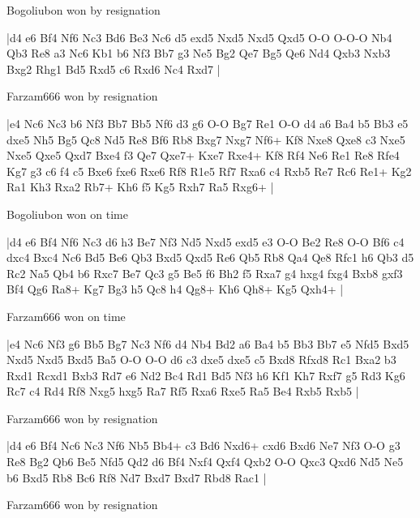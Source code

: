 Bogoliubon won by resignation

\makegametitle
|d4 e6 Bf4 Nf6 Nc3 Bd6 Be3 Nc6 d5 exd5 Nxd5 Nxd5 Qxd5 O-O O-O-O Nb4 Qb3 Re8 a3 Nc6 Kb1 b6 Nf3 Bb7 g3 Ne5 Bg2 Qe7 Bg5 Qe6 Nd4 Qxb3 Nxb3 Bxg2 Rhg1 Bd5 Rxd5 c6 Rxd6 Nc4 Rxd7  |

\showboard

Farzam666 won by resignation

\makegametitle
|e4 Nc6 Nc3 b6 Nf3 Bb7 Bb5 Nf6 d3 g6 O-O Bg7 Re1 O-O d4 a6 Ba4 b5 Bb3 e5 dxe5 Nh5 Bg5 Qc8 Nd5 Re8 Bf6 Rb8 Bxg7 Nxg7 Nf6+ Kf8 Nxe8 Qxe8 c3 Nxe5 Nxe5 Qxe5 Qxd7 Bxe4 f3 Qe7 Qxe7+ Kxe7 Rxe4+ Kf8 Rf4 Ne6 Re1 Re8 Rfe4 Kg7 g3 c6 f4 c5 Bxe6 fxe6 Rxe6 Rf8 R1e5 Rf7 Rxa6 c4 Rxb5 Re7 Rc6 Re1+ Kg2 Ra1 Kh3 Rxa2 Rb7+ Kh6 f5 Kg5 Rxh7 Ra5 Rxg6+  |

\showboard

Bogoliubon won on time

\makegametitle
|d4 e6 Bf4 Nf6 Nc3 d6 h3 Be7 Nf3 Nd5 Nxd5 exd5 e3 O-O Be2 Re8 O-O Bf6 c4 dxc4 Bxc4 Nc6 Bd5 Be6 Qb3 Bxd5 Qxd5 Re6 Qb5 Rb8 Qa4 Qe8 Rfc1 h6 Qb3 d5 Rc2 Na5 Qb4 b6 Rxc7 Be7 Qc3 g5 Be5 f6 Bh2 f5 Rxa7 g4 hxg4 fxg4 Bxb8 gxf3 Bf4 Qg6 Ra8+ Kg7 Bg3 h5 Qc8 h4 Qg8+ Kh6 Qh8+ Kg5 Qxh4+  |

\showboard

Farzam666 won on time

\makegametitle
|e4 Nc6 Nf3 g6 Bb5 Bg7 Nc3 Nf6 d4 Nb4 Bd2 a6 Ba4 b5 Bb3 Bb7 e5 Nfd5 Bxd5 Nxd5 Nxd5 Bxd5 Ba5 O-O O-O d6 c3 dxe5 dxe5 c5 Bxd8 Rfxd8 Rc1 Bxa2 b3 Rxd1 Rcxd1 Bxb3 Rd7 e6 Nd2 Bc4 Rd1 Bd5 Nf3 h6 Kf1 Kh7 Rxf7 g5 Rd3 Kg6 Rc7 c4 Rd4 Rf8 Nxg5 hxg5 Ra7 Rf5 Rxa6 Rxe5 Ra5 Be4 Rxb5 Rxb5  |

\showboard

Farzam666 won by resignation

\makegametitle
|d4 e6 Bf4 Nc6 Nc3 Nf6 Nb5 Bb4+ c3 Bd6 Nxd6+ cxd6 Bxd6 Ne7 Nf3 O-O g3 Re8 Bg2 Qb6 Be5 Nfd5 Qd2 d6 Bf4 Nxf4 Qxf4 Qxb2 O-O Qxc3 Qxd6 Nd5 Ne5 b6 Bxd5 Rb8 Bc6 Rf8 Nd7 Bxd7 Bxd7 Rbd8 Rac1  |

\showboard

Farzam666 won by resignation

